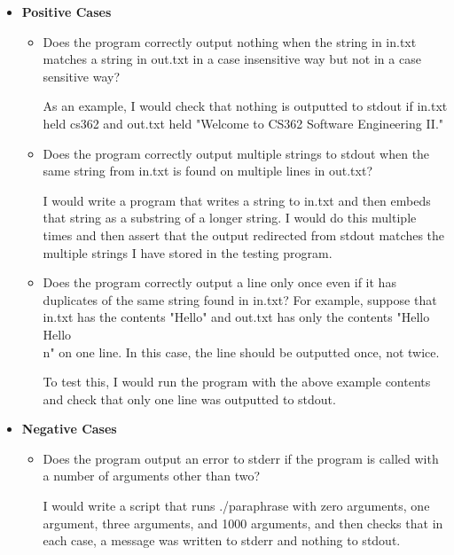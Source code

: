 \documentclass[11pt,letterpaper]{article}
\begin{document}
\begin{enumerate}[label=\arabic*.]
    \begin{itemize}
      \item \textbf{Positive Cases}
        \begin{itemize}

          \item Does the program correctly output nothing when the string in
            in.txt matches a string in out.txt in a case insensitive way but
            not in a case sensitive way?

            As an example, I would check that nothing is outputted to stdout
            if in.txt held cs362 and out.txt held "Welcome to CS362 Software
            Engineering II." 

        \item Does the program correctly output multiple strings to stdout 
          when the same string from in.txt is found on multiple lines in 
          out.txt?
          
            I would write a program that writes a string to in.txt
            and then embeds that string as a substring of a longer string. I would
            do this multiple times and then assert that the output redirected from
            stdout matches the multiple strings I have stored in the testing program.

      \item Does the program correctly output a line only once even if it has duplicates
        of the same string found in in.txt? For example, suppose that in.txt has the 
            contents "Hello" and out.txt has only the contents "Hello Hello\\n" on one line. In this case, 
            the line should be outputted once, not twice. 

            To test this, I would run the program with the above example contents and
            check that only one line was outputted to stdout. 

        \end{itemize}

      \item \textbf{Negative Cases}

        \begin{itemize}
          \item Does the program output an error to stderr if the program is
            called with a number of arguments other than two?

            I would write a script that runs ./paraphrase with 
            zero arguments, one argument, three arguments, and 
            1000 arguments, and then checks that in each case, 
            a message was written to stderr and nothing to stdout. 


\end{itemize}
\end{itemize}
\end{enumerate}
\end{document}
